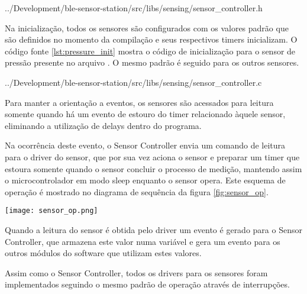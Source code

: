 \begin{minipage}{0.95\linewidth} 

{../Development/ble-sensor-station/src/libs/sensing/sensor_controller.h}
\end{minipage}

Na inicialização, todos os sensores são configurados com os valores padrão que
são definidos no momento da compilação e seus respectivos timers inicializam. O
código fonte \ref{lst:pressure_init} mostra o código de inicialização para o
sensor de pressão presente no arquivo . O mesmo
padrão é seguido para os outros sensores.

\begin{minipage}{0.95\linewidth} 
 
{../Development/ble-sensor-station/src/libs/sensing/sensor_controller.c}
\end{minipage}

Para manter a orientação a eventos, os sensores são acessados para
leitura somente quando há um evento de estouro do timer relacionado àquele
sensor, eliminando a utilização de delays dentro do programa. 

Na ocorrência deste evento, o Sensor Controller envia um comando de
leitura para o driver do sensor, que por sua vez aciona o sensor e
preparar um timer que estoura somente quando o sensor concluir o processo
de medição, mantendo assim o microcontrolador em modo sleep enquanto o sensor
opera. Este esquema de operação é mostrado no diagrama de sequência da figura
\ref{fig:sensor_op}.

\begin{center}
	\centering 
	\texttt{[image: sensor\_op.png]}
	\label{fig:sensor_op}
\end{center} 

Quando a leitura do sensor é obtida pelo driver um evento é gerado para o Sensor
Controller, que armazena este valor numa variável e gera um evento para os
outros módulos do software que utilizam estes valores.

Assim como o Sensor Controller, todos os drivers para os sensores foram
implementados seguindo o mesmo padrão de operação através de interrupções.


